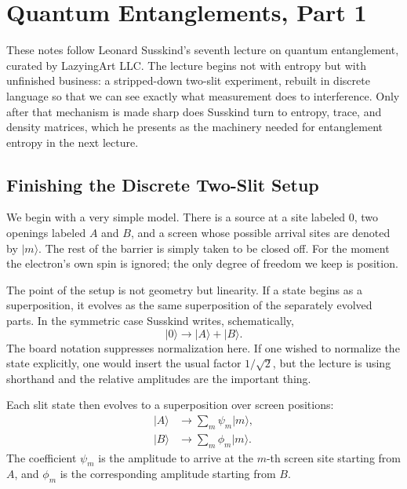 \chapter{Quantum Entanglements, Part 1}

These notes follow Leonard Susskind's seventh lecture on quantum entanglement, curated by LazyingArt LLC. The lecture begins not with entropy but with unfinished business: a stripped-down two-slit experiment, rebuilt in discrete language so that we can see exactly what measurement does to interference. Only after that mechanism is made sharp does Susskind turn to entropy, trace, and density matrices, which he presents as the machinery needed for entanglement entropy in the next lecture.

\section{Finishing the Discrete Two-Slit Setup}

We begin with a very simple model. There is a source at a site labeled \(0\), two openings labeled \(A\) and \(B\), and a screen whose possible arrival sites are denoted by \(|m\rangle\). The rest of the barrier is simply taken to be closed off. For the moment the electron's own spin is ignored; the only degree of freedom we keep is position.

The point of the setup is not geometry but linearity. If a state begins as a superposition, it evolves as the same superposition of the separately evolved parts. In the symmetric case Susskind writes, schematically,
\begin{equation}
|0\rangle \longrightarrow |A\rangle + |B\rangle .
\end{equation}
The board notation suppresses normalization here. If one wished to normalize the state explicitly, one would insert the usual factor \(1/\sqrt{2}\), but the lecture is using shorthand and the relative amplitudes are the important thing.

Each slit state then evolves to a superposition over screen positions:
\begin{align}
|A\rangle &\longrightarrow \sum_m \psi_m |m\rangle , \\
|B\rangle &\longrightarrow \sum_m \phi_m |m\rangle .
\end{align}
The coefficient \(\psi_m\) is the amplitude to arrive at the \(m\)-th screen site starting from \(A\), and \(\phi_m\) is the corresponding amplitude starting from \(B\).

